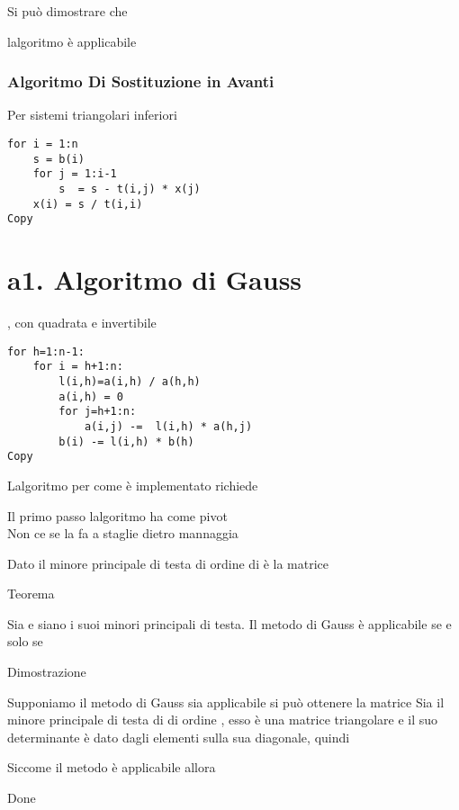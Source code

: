\documentclass[
]{article}
\begin{document}
Si può dimostrare che {}

{} l\textquotesingle algoritmo è applicabile

\hypertarget{algoritmo-di-sostituzione-in-avanti}{%
\subsubsection{Algoritmo Di Sostituzione in
Avanti}\label{algoritmo-di-sostituzione-in-avanti}}

Per sistemi triangolari inferiori

\begin{verbatim}
for i = 1:n
    s = b(i)
    for j = 1:i-1
        s  = s - t(i,j) * x(j)
    x(i) = s / t(i,i)
Copy
\end{verbatim}

\hypertarget{a1.-algoritmo-di-gauss}{%
\section{a1. Algoritmo di Gauss}\label{a1.-algoritmo-di-gauss}}

{}, con {} quadrata e invertibile

\begin{verbatim}
for h=1:n-1:
    for i = h+1:n:
        l(i,h)=a(i,h) / a(h,h)
        a(i,h) = 0
        for j=h+1:n:
            a(i,j) -=  l(i,h) * a(h,j)
        b(i) -= l(i,h) * b(h)
Copy
\end{verbatim}

L\textquotesingle algoritmo per come è implementato richiede

{}

Il primo passo l\textquotesingle algoritmo ha come pivot {}\\
Non ce se la fa a staglie dietro mannaggia

Dato {} il minore principale di testa di ordine {} di {} è la matrice {}

Teorema

Sia {} e siano {} i suoi minori principali di testa. Il metodo di Gauss
è applicabile se e solo se {}

Dimostrazione

Supponiamo il metodo di Gauss sia applicabile {} si può ottenere la
matrice {}Sia {} il minore principale di testa di {} di ordine {}, esso
è una matrice triangolare e il suo determinante è dato dagli elementi
sulla sua diagonale, quindi {}

Siccome il metodo è applicabile allora {}

Done
\end{document}
